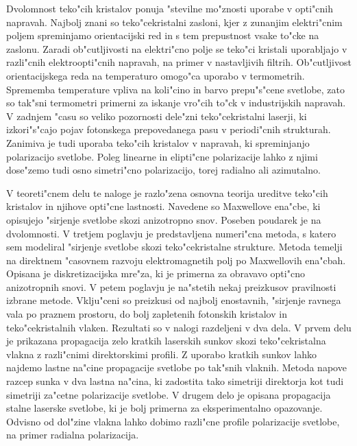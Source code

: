 \documentclass[a4paper,10pt]{article}
\begin{document}
Dvolomnost teko"cih kristalov ponuja "stevilne mo"znosti uporabe v opti"cnih napravah. 
Najbolj znani so teko"cekristalni zasloni, kjer z zunanjim elektri"cnim poljem spreminjamo orientacijski red in s tem prepustnost vsake to"cke na zaslonu. 
Zaradi ob"cutljivosti na elektri"cno polje se teko"ci kristali uporabljajo v razli"cnih elektroopti"cnih napravah, na primer v nastavljivih filtrih. 
Ob"cutljivost orientacijskega reda na temperaturo omogo"ca uporabo v termometrih. 
Sprememba temperature vpliva na koli"cino in barvo prepu"s"cene svetlobe, zato so tak"sni termometri primerni za iskanje vro"cih to"ck v industrijskih napravah\cite{hot-spots}. 
V zadnjem "casu so veliko pozornosti dele"zni teko"cekristalni laserji, ki izkori"s"cajo pojav fotonskega prepovedanega pasu v periodi"cnih strukturah\cite{humar-musevic,coles-morris}. 
Zanimiva je tudi uporaba teko"cih kristalov v napravah, ki spreminjanjo polarizacijo svetlobe. 
Poleg linearne in elipti"cne polarizacije lahko z njimi dose"zemo tudi osno simetri"cno polarizacijo, torej radialno ali azimutalno\cite{polarization-converters-linear,polarization-converters-axial}. 

V teoreti"cnem delu te naloge je razlo"zena osnovna teorija ureditve teko"cih kristalov in njihove opti"cne lastnosti. 
Navedene so Maxwellove ena"cbe, ki opisujejo "sirjenje svetlobe skozi anizotropno snov. 
Poseben poudarek je na dvolomnosti. 
V tretjem poglavju je predstavljena numeri"cna metoda, s katero sem modeliral "sirjenje svetlobe skozi teko"cekristalne strukture. 
Metoda temelji na direktnem "casovnem razvoju elektromagnetih polj po Maxwellovih ena"cbah. 
Opisana je diskretizacijska mre"za, ki je primerna za obravavo opti"cno anizotropnih snovi. 
V petem poglavju je na"stetih nekaj preizkusov pravilnosti izbrane metode. 
Vklju"ceni so preizkusi od najbolj enostavnih, "sirjenje ravnega vala po praznem prostoru, do bolj zapletenih fotonskih kristalov in teko"cekristalnih vlaken. 
Rezultati so v nalogi razdeljeni v dva dela. 
V prvem delu je prikazana propagacija zelo kratkih laserskih sunkov skozi teko"cekristalna vlakna z razli"cnimi direktorskimi profili. 
Z uporabo kratkih sunkov lahko najdemo lastne na"cine propagacije svetlobe po tak"snih vlaknih. 
Metoda napove razcep sunka v dva lastna na"cina, ki zadostita tako simetriji direktorja kot tudi simetriji za"cetne polarizacije svetlobe. 
V drugem delo je opisana propagacija stalne laserske svetlobe, ki je bolj primerna za eksperimentalno opazovanje. 
Odvisno od dol"zine vlakna lahko dobimo razli"cne profile polarizacije svetlobe, na primer radialna polarizacija. 
\end{document}
